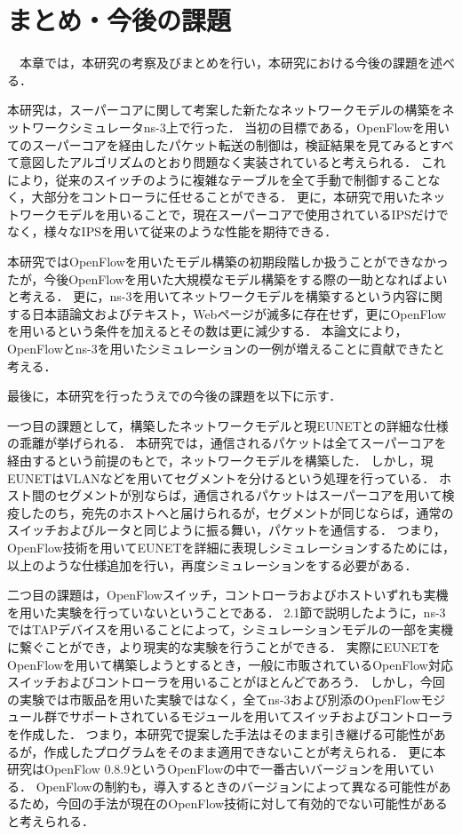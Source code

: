 \chapter{まとめ・今後の課題}

　本章では，本研究の考察及びまとめを行い，本研究における今後の課題を述べる．

本研究は，スーパーコアに関して考案した新たなネットワークモデルの構築をネットワークシミュレータns-3上で行った．
当初の目標である，OpenFlowを用いてのスーパーコアを経由したパケット転送の制御は，検証結果を見てみるとすべて意図したアルゴリズムのとおり問題なく実装されていると考えられる．
これにより，従来のスイッチのように複雑なテーブルを全て手動で制御することなく，大部分をコントローラに任せることができる．
更に，本研究で用いたネットワークモデルを用いることで，現在スーパーコアで使用されているIPSだけでなく，様々なIPSを用いて従来のような性能を期待できる．

本研究ではOpenFlowを用いたモデル構築の初期段階しか扱うことができなかったが，今後OpenFlowを用いた大規模なモデル構築をする際の一助となればよいと考える．
更に，ns-3を用いてネットワークモデルを構築するという内容に関する日本語論文およびテキスト，Webページが滅多に存在せず，更にOpenFlowを用いるという条件を加えるとその数は更に減少する．
本論文により，OpenFlowとns-3を用いたシミュレーションの一例が増えることに貢献できたと考える．

最後に，本研究を行ったうえでの今後の課題を以下に示す．

一つ目の課題として，構築したネットワークモデルと現EUNETとの詳細な仕様の乖離が挙げられる．
本研究では，通信されるパケットは全てスーパーコアを経由するという前提のもとで，ネットワークモデルを構築した．
しかし，現EUNETはVLANなどを用いてセグメントを分けるという処理を行っている．
ホスト間のセグメントが別ならば，通信されるパケットはスーパーコアを用いて検疫したのち，宛先のホストへと届けられるが，セグメントが同じならば，通常のスイッチおよびルータと同じように振る舞い，パケットを通信する．
つまり，OpenFlow技術を用いてEUNETを詳細に表現しシミュレーションするためには，以上のような仕様追加を行い，再度シミュレーションをする必要がある．

二つ目の課題は，OpenFlowスイッチ，コントローラおよびホストいずれも実機を用いた実験を行っていないということである．
2.1節で説明したように，ns-3ではTAPデバイスを用いることによって，シミュレーションモデルの一部を実機に繋ぐことができ，より現実的な実験を行うことができる．
実際にEUNETをOpenFlowを用いて構築しようとするとき，一般に市販されているOpenFlow対応スイッチおよびコントローラを用いることがほとんどであろう．
しかし，今回の実験では市販品を用いた実験ではなく，全てns-3および別添のOpenFlowモジュール群でサポートされているモジュールを用いてスイッチおよびコントローラを作成した．
つまり，本研究で提案した手法はそのまま引き継げる可能性があるが，作成したプログラムをそのまま適用できないことが考えられる．
更に本研究はOpenFlow 0.8.9というOpenFlowの中で一番古いバージョンを用いている．
OpenFlowの制約も，導入するときのバージョンによって異なる可能性があるため，今回の手法が現在のOpenFlow技術に対して有効的でない可能性があると考えられる．